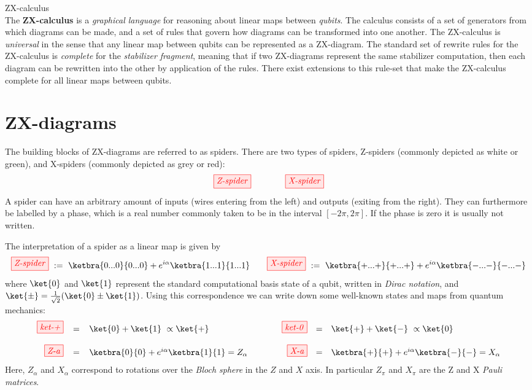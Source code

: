 \documentclass[a4paper, 12pt]{article}
\begin{document}
{\Huge ZX-calculus} \\

The \textbf{ZX-calculus} is a \emph{graphical language} for reasoning about linear maps between \emph{qubits}. The calculus consists of a set of generators from which diagrams can be made, and a set of rules that govern how diagrams can be transformed into one another. The ZX-calculus is \emph{universal} in the sense that any linear map between qubits can be represented as a ZX-diagram. The standard set of rewrite rules for the ZX-calculus is \emph{complete} for the \emph{stabilizer fragment}, meaning that if two ZX-diagrams represent the same stabilizer computation, then each diagram can be rewritten into the other by application of the rules. There exist extensions to this rule-set that make the ZX-calculus complete for all linear maps between qubits.

\section{ZX-diagrams}
The building blocks of ZX-diagrams are referred to as spiders. There are two types of spiders, Z-spiders (commonly depicted as white or green), and X-spiders (commonly depicted as grey or red):
\begin{equation*}
    \tikzfig{Z-spider} \qquad \qquad \tikzfig{X-spider}
\end{equation*}
A spider can have an arbitrary amount of inputs (wires entering from the left) and outputs (exiting from the right). They can furthermore be labelled by a phase, which is a real number commonly taken to be in the interval $[-2\pi, 2\pi]$. If the phase is zero it is usually not written.

The interpretation of a spider as a linear map is given by
\begin{equation*}
    \tikzfig{Z-spider}\ := \ \ketbra{0...0}{0...0} +
e^{i \alpha} \ketbra{1...1}{1...1} \hfill
\qquad
\hfill \tikzfig{X-spider} \ := \ \ketbra{+...+}{+...+} +
e^{i \alpha} \ketbra{-...-}{-...-}
\end{equation*}
where $\ket{0}$ and $\ket{1}$ represent the standard computational basis state of a qubit, written in \emph{Dirac notation}, and $\ket{\pm} = \frac{1}{\sqrt{2}} (\ket{0} \pm \ket{1})$. Using this correspondence we can write down some well-known states and maps from quantum mechanics:
\begin{equation*}
  \begin{array}{rclcrcl}
  \tikzfig{ket-+} & = & \ket{0} + \ket{1} \ \propto \ket{+} &
  \qquad &
  \tikzfig{ket-0} & = & \ket{+} + \ket{-} \ \propto \ket{0} \\
  &\quad& & & \quad \\
  \tikzfig{Z-a} & = & \ketbra{0}{0} + e^{i \alpha} \ketbra{1}{1} =
  Z_\alpha &
  & 
  \tikzfig{X-a} & = & \ketbra{+}{+} + e^{i \alpha} \ketbra{-}{-} = X_\alpha
  \end{array}
\end{equation*}
Here, $Z_\alpha$ and $X_\alpha$ correspond to rotations over the \emph{Bloch sphere}  in the $Z$ and $X$ axis. In particular $Z_\pi$ and $X_\pi$ are the Z and X \emph{Pauli matrices}.
\end{document}
